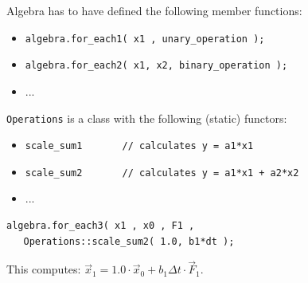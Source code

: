 \begin{frame}[fragile]

\vspace{1ex}
Algebra has to have defined the following member functions:

\begin{itemize}
 \item \lstinline+algebra.for_each1( x1 , unary_operation );+
 \item \lstinline+algebra.for_each2( x1, x2, binary_operation );+
 \item ...
\end{itemize}

\vspace{2ex}

\lstinline+Operations+ is a class with the following (static) functors:
\begin{itemize}
 \item \lstinline+scale_sum1       // calculates y = a1*x1+
 \item \lstinline{scale_sum2       // calculates y = a1*x1 + a2*x2}
 \item ...
\end{itemize}

\vspace{2ex}
\begin{lstlisting}
algebra.for_each3( x1 , x0 , F1 ,
   Operations::scale_sum2( 1.0, b1*dt );
\end{lstlisting}

This computes: $\vec x_1 = 1.0\cdot \vec x_0 + b_1\Delta t\cdot \vec F_1$.
\end{frame}







